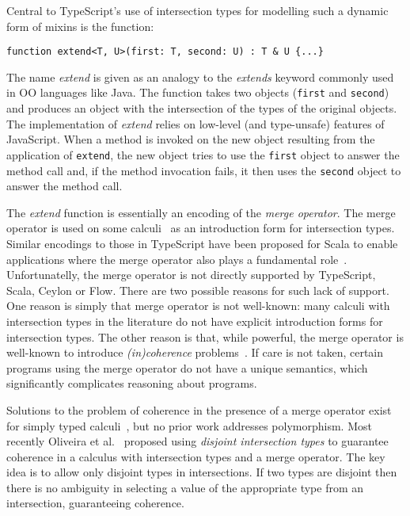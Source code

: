 Central to TypeScript's use of intersection types for modelling such a
dynamic form of mixins is the function:

\begin{lstlisting}
function extend<T, U>(first: T, second: U) : T & U {...}
\end{lstlisting}

\noindent The name \emph{extend} is given as an analogy to the
\emph{extends} keyword commonly used in OO languages like Java.
The function takes two objects (\lstinline{first} and
\lstinline{second}) and produces an object with the intersection of
the types of the original objects. The implementation of
\emph{extend} relies on low-level (and type-unsafe) features of 
JavaScript. When a method is invoked on the new object resulting from 
the application of \lstinline{extend}, the new object tries to use the 
\lstinline{first} object to answer the method call and, if the method
invocation fails, it then uses the \lstinline{second} object to answer
the method call. 

The \emph{extend} function is essentially an encoding of the
\emph{merge operator}. The merge operator is used on some
calculi~\cite{reynolds,castagna,dunfield2014elaborating,oliveira} as
an introduction form for intersection types. Similar encodings to
those in TypeScript have been proposed for Scala to enable
applications where the merge operator also plays a fundamental
role~\cite{}. Unfortunatelly, the merge operator is not directly
supported by TypeScript, Scala, Ceylon or Flow. There are two possible
reasons for such lack of support. One reason is simply that merge operator is
not well-known: many calculi with intersection types in the literature
do not have explicit introduction forms for intersection types. The
other reason is that, while powerful, the merge operator is well-known
to introduce \emph{(in)coherence} problems~\cite{}.  If care is not
taken, certain programs using the merge operator do not have a unique
semantics, which significantly complicates reasoning about programs.

Solutions to the problem of coherence in the presence 
of a merge operator exist for simply typed calculi~\cite{}, but no prior
work addresses polymorphism. Most recently Oliveira
et al.~\cite{oliveira16disjoint} proposed using \emph{disjoint intersection types} to 
guarantee coherence in a calculus with intersection types and a merge 
operator. The key idea is to allow only disjoint types in
intersections. If two types are disjoint then there is no ambiguity in
selecting a value of the appropriate type from an intersection, 
guaranteeing coherence.

